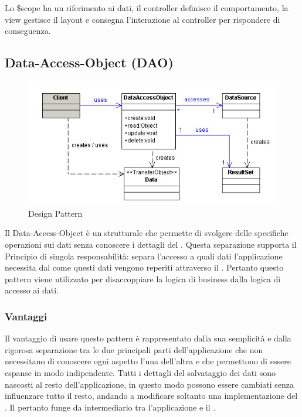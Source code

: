 \documentclass[a4paper, titlepage]{article}
\begin{document}
Lo \$scope ha un riferimento ai dati, il controller definisce il comportamento, la view gestisce il layout e consegna l’interazione al controller per rispondere di conseguenza.

\subsection{Data-Access-Object (DAO)}
\begin{figure}[htp]
\centering
\includegraphics[scale=0.75]{Img/dao.jpg}
\caption{Design Pattern }
\label{}
\end{figure}
Il Data-Access-Object è un  strutturale che permette di svolgere delle specifiche operazioni sui dati senza conoscere i dettagli del . Questa separazione supporta il Principio di singola responsabilità: separa l'accesso a quali dati l'applicazione necessita dal come questi dati vengono reperiti attraverso il .
Pertanto questo pattern viene utilizzato per disaccoppiare la logica di business dalla logica di accesso ai dati. 

\subsubsection{Vantaggi}
Il vantaggio di usare questo pattern è rappresentato dalla sua semplicità e dalla rigorosa separazione tra le due principali parti dell'applicazione che non necessitano di conoscere ogni aspetto l'una dell'altra e che permettono di essere espanse in modo indipendente.
Tutti i dettagli del salvataggio dei dati sono nascosti al resto dell'applicazione, in questo modo possono essere cambiati senza influenzare tutto il resto, andando a modificare soltanto una implementazione del .
\newline Il  pertanto funge da intermediario tra l'applicazione e il .
\end{document}
